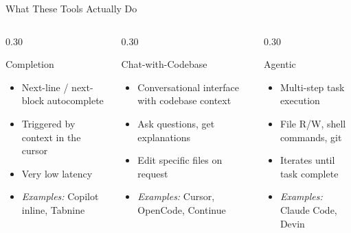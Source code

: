\begin{frame}{What These Tools Actually Do}
  \begin{columns}[T, onlytextwidth]
    \begin{column}{0.30\textwidth}
      \begin{block}{Completion}
        \begin{itemize}
          \item Next-line / next-block autocomplete
          \item Triggered by context in the cursor
          \item Very low latency
          \item \textit{Examples:} Copilot inline, Tabnine
        \end{itemize}
      \end{block}
    \end{column}
    \hfill
    \begin{column}{0.30\textwidth}
      \begin{block}{Chat-with-Codebase}
        \begin{itemize}
          \item Conversational interface with codebase context
          \item Ask questions, get explanations
          \item Edit specific files on request
          \item \textit{Examples:} Cursor, OpenCode, Continue
        \end{itemize}
      \end{block}
    \end{column}
    \hfill
    \begin{column}{0.30\textwidth}
      \begin{block}{Agentic}
        \begin{itemize}
          \item Multi-step task execution
          \item File R/W, shell commands, git
          \item Iterates until task complete
          \item \textit{Examples:} Claude Code, Devin
        \end{itemize}
      \end{block}
    \end{column}
  \end{columns}
\end{frame}

